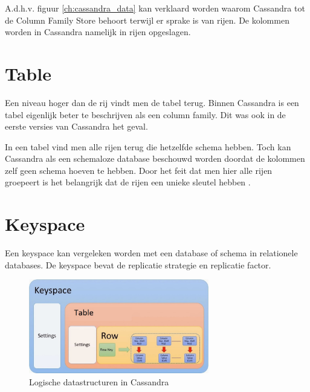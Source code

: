 A.d.h.v. figuur \ref{ch:cassandra_data} kan verklaard worden waarom Cassandra tot de Column Family Store behoort terwijl er sprake is van rijen.
De kolommen worden in Cassandra namelijk in rijen opgeslagen.

\section{Table}
Een niveau hoger dan de rij vindt men de tabel terug.
Binnen Cassandra is een tabel eigenlijk beter te beschrijven als een column family.
Dit was ook in de eerste versies van Cassandra het geval.

In een tabel vind men alle rijen terug die hetzelfde schema hebben.
Toch kan Cassandra als een schemaloze database beschouwd worden doordat de kolommen zelf geen schema hoeven te hebben.
Door het feit dat men hier alle rijen groepeert is het belangrijk dat de rijen een unieke sleutel hebben \citep{hewitt2010cassandra}.

\section{Keyspace}
Een keyspace kan vergeleken worden met een database of schema in relationele databases.
De keyspace bevat de replicatie strategie en replicatie factor.

\begin{figure}[H]
	\centering
	\includegraphics[width=0.7\textwidth]{img/4_data/data}
	\caption{Logische datastructuren in Cassandra}
	\label{fig:datastructure}
\end{figure}